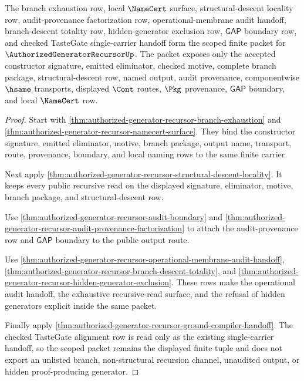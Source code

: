 \begin{theorem}
\label{thm:authorized-generator-recursor-scope-package}
The branch exhaustion row, local $\NameCert$ surface, structural-descent locality row, audit-provenance factorization row, operational-membrane audit handoff, branch-descent totality row, hidden-generator exclusion row, $\mathsf{GAP}$ boundary row, and checked TasteGate single-carrier handoff form the scoped finite packet for $\AuthorizedGeneratorRecursorUp$. The packet exposes only the accepted constructor signature, emitted eliminator, checked motive, complete branch package, structural-descent row, named output, audit provenance, componentwise $\hsame$ transports, displayed $\Cont$ routes, $\Pkg$ provenance, $\mathsf{GAP}$ boundary, and local $\NameCert$ row.
\end{theorem}
\begin{proof}
Start with \autoref{thm:authorized-generator-recursor-branch-exhaustion} and \autoref{thm:authorized-generator-recursor-namecert-surface}. They bind the constructor signature, emitted eliminator, motive, branch package, output name, transport, route, provenance, boundary, and local naming rows to the same finite carrier.

Next apply \autoref{thm:authorized-generator-recursor-structural-descent-locality}. It keeps every public recursive read on the displayed signature, eliminator, motive, branch package, and structural-descent row.

Use \autoref{thm:authorized-generator-recursor-audit-boundary} and \autoref{thm:authorized-generator-recursor-audit-provenance-factorization} to attach the audit-provenance row and $\mathsf{GAP}$ boundary to the public output route.

Use \autoref{thm:authorized-generator-recursor-operational-membrane-audit-handoff}, \autoref{thm:authorized-generator-recursor-branch-descent-totality}, and \autoref{thm:authorized-generator-recursor-hidden-generator-exclusion}. These rows make the operational audit handoff, the exhaustive recursive-read surface, and the refusal of hidden generators explicit inside the same packet.

Finally apply \autoref{thm:authorized-generator-recursor-ground-compiler-handoff}. The checked TasteGate alignment row is read only as the existing single-carrier handoff, so the scoped packet remains the displayed finite tuple and does not export an unlisted branch, non-structural recursion channel, unaudited output, or hidden proof-producing generator.
\end{proof}

